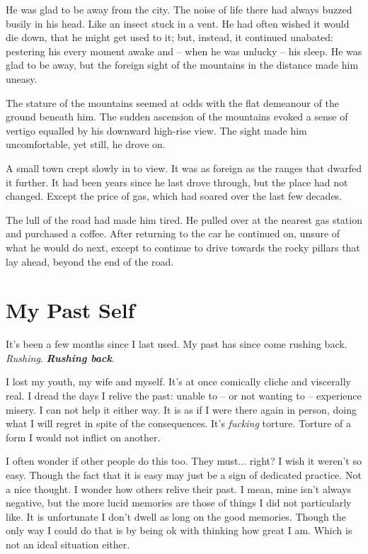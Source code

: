 \documentclass[fontsize=12pt,english]{scrreprt}
\begin{document}
He was glad to be away from the city. The noise of life there had
always buzzed busily in his head. Like an insect stuck in a vent. He
had often wished it would die down, that he might get used to it; but,
instead, it continued unabated: pestering his every moment awake and
-- when he was unlucky -- his sleep. He was glad to be away, but the
foreign sight of the mountains in the distance made him uneasy.

The stature of the mountains seemed at odds with the flat demeanour of
the ground beneath him. The sudden ascension of the mountains evoked a
sense of vertigo equalled by his downward high-rise view. The sight
made him uncomfortable, yet still, he drove on.

A small town crept slowly in to view. It was as foreign as the ranges
that dwarfed it further. It had been years since he last drove
through, but the place had not changed. Except the price of gas, which
had soared over the last few decades.

The lull of the road had made him tired. He pulled over at the nearest
gas station and purchased a coffee. After returning to the car he
continued on, unsure of what he would do next, except to continue to
drive towards the rocky pillars that lay ahead, beyond the end of the
road.

\newpage

\section{My Past Self}

It's been a few months since I last used. My past has since come
rushing back. \textit{Rushing}. \textbf{\textit{Rushing back}}.

I lost my youth, my wife and myself. It's at once comically cliche and
viscerally real. I dread the days I relive the past: unable to -- or
not wanting to -- experience misery. I can not help it either way. It
is as if I were there again in person, doing what I will regret in
spite of the consequences. It's \textit{fucking} torture. Torture of a
form I would not inflict on another.

I often wonder if other people do this too. They must... right? I wish
it weren't so easy. Though the fact that it is easy may just be a sign
of dedicated practice. Not a nice thought. I wonder how others relive
their past. I mean, mine isn't always negative, but the more lucid
memories are those of things I did not particularly like. It is
unfortunate I don't dwell as long on the good memories. Though the
only way I could do that is by being ok with thinking how great I
am. Which is not an ideal situation either.
\end{document}
